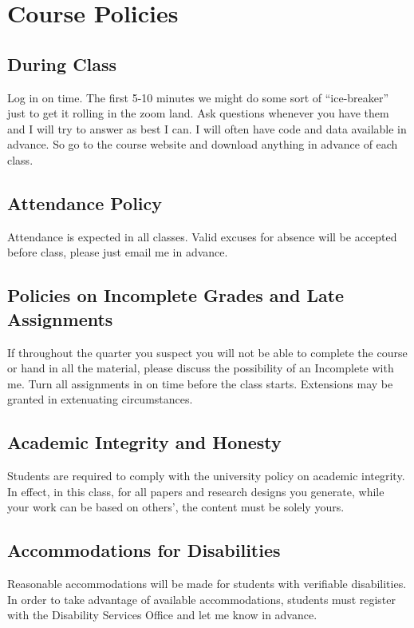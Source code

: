 \documentclass[11pt]{article}
\begin{document}
\section*{Course Policies}

\subsection*{During Class}
\footnotesize{Log in on time. The first 5-10 minutes we might do some sort of ``ice-breaker'' just to get it rolling in the zoom land. Ask questions whenever you have them and I will try to answer as best I can. I will often have code and data available in advance. So go to the course website and download anything in advance of each class.}

\subsection*{Attendance Policy}
\footnotesize{Attendance is expected in all classes. Valid excuses for absence will be accepted before class, please just email me in advance.}

\subsection*{Policies on Incomplete Grades and Late Assignments}
\footnotesize{If throughout the quarter you suspect you will not be able to complete the course or hand in all the material, please discuss the possibility of an Incomplete with me. Turn all assignments in on time before the class starts. Extensions may be granted in extenuating circumstances.}

\subsection*{Academic Integrity and Honesty}
\footnotesize{Students are required to comply with the university policy on academic integrity. In effect, in this class, for all papers and research designs you generate, while your work can be based on others', the content must be solely yours.}

\subsection*{Accommodations for Disabilities}
\footnotesize{Reasonable accommodations will be made for students with verifiable disabilities. In order to take advantage of available accommodations, students must register with the Disability Services Office and let me know in advance.}
\end{document}
